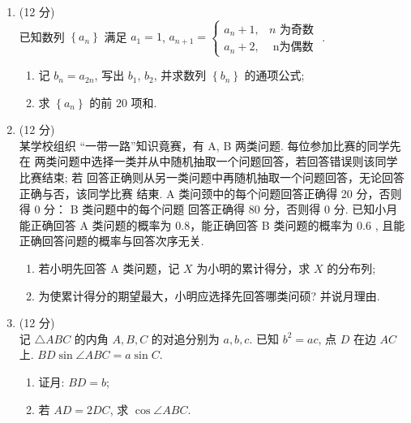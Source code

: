 \documentclass[11pt,space]{ctexart} %
\begin{document}
\begin{enumerate}[itemsep=0.5em,topsep=5pt,resume]%
	\item (12 分)\\
	 已知数列 $ \left\{a_{n}\right\} $ 满足 $ a_{1}=1$,
	 $a_{n+1}=
	 \begin{cases}
	 a_{n}+1, & n \text { 为奇数 } \\ a_{n}+2, & \text { n为偶数 }
	 \end{cases}$.

	 \begin{enumerate}[itemsep=-0.3em,label={(\arabic*)},topsep=0pt,labelsep=.5em,leftmargin=3em]
		\item 记 $ b_{n}=a_{2 n} $, 写出 $ b_{1}$, $b_{2} $, 并求数列 $ \left\{b_{n}\right\} $ 的通项公式;
		\item 求 $ \left\{a_{n}\right\} $ 的前 20 项和.
	\end{enumerate}

\item  (12 分)\\
某学校组织 “一带一路”知识竟赛，有 A, B  两类问题. 每位参加比赛的同学先在
两类问题中选择一类并从中随机抽取一个问题回答，若回答错误则该同学比赛结束; 若
回答正确则从另一类问题中再随机抽取一个问题回答，无论回答正确与否，该同学比赛
结東. A 类问颈中的每个问题回答正确得 20 分，否则得 0 分：  B  类问题中的每个问题
回答正确得 $80$ 分，否则得 0 分.
已知小月能正确回答  A  类问题的概率为 $ 0.8  $，能正确回答  B  类问题的概率为  0.6 ,
且能正确回答问题的概率与回答次序无关.
\begin{enumerate}[itemsep=-0.3em,label={(\arabic*)},topsep=0pt,labelsep=.5em,leftmargin=3em]
	\item 若小明先回答  A  类问题，记 $ X $ 为小明的累计得分，求 $ X $ 的分布列;
	\item 为使累计得分的期望最大，小明应选择先回答哪类问硕? 并说月理由.
\end{enumerate}

\newpage
\item (12 分)\\
记  $\triangle A B C$  的内角  $A, B, C$  的对追分别为 $ a, b, c $.  已知 $ b^{2}=a c $, 点  $D $ 在边 $ A C$
上. $ B D \sin \angle A B C=a \sin C$.

\begin{enumerate}[itemsep=-0.3em,label={(\arabic*)},topsep=0pt,labelsep=.5em,leftmargin=3em]
	\item 证月: $ B D=b $;
	\item 若 $ A D=2 D C $, 求 $ \cos \angle A B C $.
\end{enumerate}



\end{enumerate}
\end{document}
